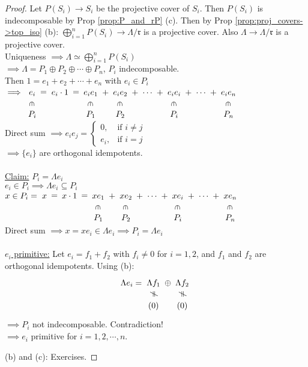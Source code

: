 \begin{proof}
Let $P(S_i) \to S_i$ be the projective cover of $S_i$. Then $P(S_i)$ is indecomposable by Prop \ref{prop:P_and_rP} (c). Then by Prop \ref{prop:proj_covers->top_iso} (b): $\bigoplus_{i=1}^n P(S_i) \to \Lambda/ \mathfrak{r}$ is a projective cover. Also $\Lambda \to \Lambda / \mathfrak{r}$ is a projective cover.\\
Uniqueness $\implies \Lambda \simeq \bigoplus_{i=1}^n P(S_i)$\\
$\implies \Lambda = P_1 \oplus P_2 \oplus \cdots \oplus P_n$, $P_i$ indecomposable.\\
Then $1 = e_1 + e_2 + \cdots + e_n$ with $e_i \in P_i$\\
$\implies \xymatrix@C-1pc@R-1pc{
e_i \ar@{}[r]|-*[@]{=} \ar@{}[d]|-*[@]{\in} & e_i \cdot 1 \ar@{}[r]|-*[@]{=} & e_ie_1 \ar@{}[r]|-*[@]{+}\ar@{}[d]|-*[@]{\in} & e_ie_2 \ar@{}[r]|-*[@]{+}\ar@{}[d]|-*[@]{\in} & \cdots \ar@{}[r]|-*[@]{+} & e_ie_i \ar@{}[r]|-*[@]{+}\ar@{}[d]|-*[@]{\in} & \cdots \ar@{}[r]|-*[@]{+} & e_ie_n\ar@{}[d]|-*[@]{\in}\\
P_i &             & P_1    & P_2    &        & P_i    &        &  P_n
}$\\
Direct sum $\implies e_ie_j = \left\lbrace \begin{matrix}
0, & \text{if } i \neq j\\
e_i, & \text{if } i = j
\end{matrix} \right.$\\
$\implies \{ e_i \}$ are orthogonal idempotents.\\
\\
\underline{Claim:} $P_i = \Lambda e_i$\\
$e_i \in P_i \implies \Lambda e_i \subseteq P_i$\\
$x \in P_i = \xymatrix@C-1pc@R-1pc{
x \ar@{}[r]|-*[@]{=}  & x \cdot 1 \ar@{}[r]|-*[@]{=} & xe_1 \ar@{}[r]|-*[@]{+}\ar@{}[d]|-*[@]{\in} & xe_2 \ar@{}[r]|-*[@]{+}\ar@{}[d]|-*[@]{\in} & \cdots \ar@{}[r]|-*[@]{+} & xe_i \ar@{}[r]|-*[@]{+}\ar@{}[d]|-*[@]{\in} & \cdots \ar@{}[r]|-*[@]{+} & xe_n\ar@{}[d]|-*[@]{\in}\\
 &             & P_1    & P_2    &        & P_i    &        &  P_n
}$\\
Direct sum $\implies x = xe_i \in \Lambda e_i \implies P_i = \Lambda e_i$\\
\\
\underline{$e_i$ primitive:} Let $e_i = f_1 + f_2$ with $f_i \neq 0$ for $i=1,2$, and $f_1$ and $f_2$ are orthogonal idempotents. Using (b):
\[
\Lambda e_i = \xymatrix@C-1pc@R-1pc{ \Lambda f_1 \ar@{}[r]|-*[@]{\oplus}\ar@{}[d]|-*[@]{\neq} & \Lambda f_2 \ar@{}[d]|-*[@]{\neq}\\ (0) & (0)}
\]
$\implies P_i $ not indecomposable. Contradiction!\\
$\implies e_i$ primitive for $i = 1, 2, \cdots , n$.

(b) and (c): Exercises.
\end{proof}


